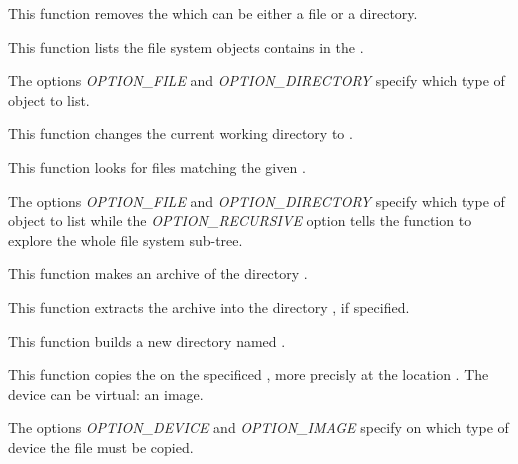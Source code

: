          {
	   This function removes the  which can be either
	   a file or a directory.
	 }

         {
	   This function lists the file system objects contains in the
	   .

	   \-

	   The options \textit{OPTION\_FILE} and \textit{OPTION\_DIRECTORY}
	   specify which type of object to list.
	 }

         {
	   This function changes the current working directory to
	   .
	 }

         {
	   This function looks for files matching the given .

	   \-

	   The options \textit{OPTION\_FILE} and \textit{OPTION\_DIRECTORY}
	   specify which type of object to list while the
	   \textit{OPTION\_RECURSIVE} option tells the function to explore
	   the whole file system sub-tree.
	 }

         {
	   This function makes an archive  of the
	   directory .
	 }

         {
	   This function extracts the archive  into the
	   directory , if specified.
	 }

         {
	   This function builds a new directory named .
	 }

         {
	   This function copies the  on the specificed
	   , more precisly at the location .
	   The device can be virtual: an image.

	   \-

	   The options \textit{OPTION\_DEVICE} and \textit{OPTION\_IMAGE}
	   specify on which type of device the file must be copied.
	 }

